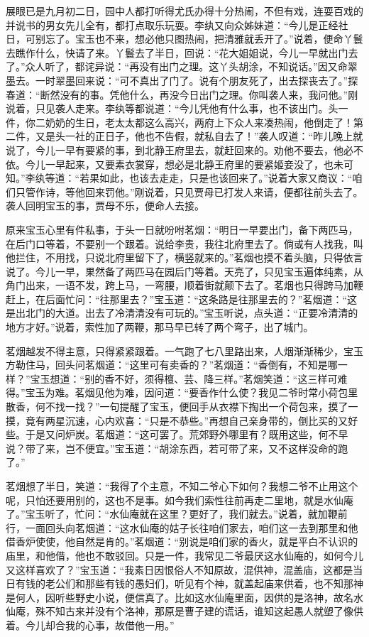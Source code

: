 \documentclass[12pt,oneside]{book}
\begin{document}
展眼已是九月初二日，园中人都打听得尤氏办得十分热闹，不但有戏，连耍百戏的并说书的男女先儿全有，都打点取乐玩耍。李纨又向众姊妹道：“今儿是正经社日，可别忘了。宝玉也不来，想必他只图热闹，把清雅就丢开了。”说着，便命丫鬟去瞧作什么，快请了来。丫鬟去了半日，回说：“花大姐姐说，今儿一早就出门去了。”众人听了，都诧异说：“再没有出门之理。这丫头胡涂，不知说话。”因又命翠墨去。一时翠墨回来说：“可不真出了门了。说有个朋友死了，出去探丧去了。”探春道：“断然没有的事。凭他什么，再没今日出门之理。你叫袭人来，我问他。”刚说着，只见袭人走来。李纨等都说道：“今儿凭他有什么事，也不该出门。头一件，你二奶奶的生日，老太太都这么高兴，两府上下众人来凑热闹，他倒走了！第二件，又是头一社的正日子，他也不告假，就私自去了！”袭人叹道：“昨儿晚上就说了，今儿一早有要紧的事，到北静王府里去，就赶回来的。劝他不要去，他必不依。今儿一早起来，又要素衣裳穿，想必是北静王府里的要紧姬妾没了，也未可知。”李纨等道：“若果如此，也该去走走，只是也该回来了。”说着大家又商议：“咱们只管作诗，等他回来罚他。”刚说着，只见贾母已打发人来请，便都往前头去了。袭人回明宝玉的事，贾母不乐，便命人去接。

原来宝玉心里有件私事，于头一日就吩咐茗烟：“明日一早要出门，备下两匹马，在后门口等着，不要别一个跟着。说给李贵，我往北府里去了。倘或有人找我，叫他拦住，不用找，只说北府里留下了，横竖就来的。”茗烟也摸不着头脑，只得依言说了。今儿一早，果然备了两匹马在园后门等着。天亮了，只见宝玉遍体纯素，从角门出来，一语不发，跨上马，一弯腰，顺着街就颠下去了。茗烟也只得跨马加鞭赶上，在后面忙问：“往那里去？”宝玉道：“这条路是往那里去的？”茗烟道：“这是出北门的大道。出去了冷清清没有可玩的。”宝玉听说，点头道：“正要冷清清的地方才好。”说着，索性加了两鞭，那马早已转了两个弯子，出了城门。

茗烟越发不得主意，只得紧紧跟着。一气跑了七八里路出来，人烟渐渐稀少，宝玉方勒住马，回头问茗烟道：“这里可有卖香的？”茗烟道：“香倒有，不知是哪一样？”宝玉想道：“别的香不好，须得檀、芸、降三样。”茗烟笑道：“这三样可难得。”宝玉为难。茗烟见他为难，因问道：“要香作什么使？我见二爷时常小荷包里散香，何不找一找？”一句提醒了宝玉，便回手从衣襟下掏出一个荷包来，摸了一摸，竟有两星沉速，心内欢喜：“只是不恭些。”再想自己亲身带的，倒比买的又好些。于是又问炉炭。茗烟道：“这可罢了。荒郊野外哪里有？既用这些，何不早说？带了来，岂不便宜。”宝玉道：“胡涂东西，若可带了来，又不这样没命的跑了。”

茗烟想了半日，笑道：“我得了个主意，不知二爷心下如何？我想二爷不止用这个呢，只怕还要用别的，这也不是事。如今我们索性往前再走二里地，就是水仙庵了。”宝玉听了，忙问：“水仙庵就在这里？更好了，我们就去。”说着，就加鞭前行，一面回头向茗烟道：“这水仙庵的姑子长往咱们家去，咱们这一去到那里和他借香炉使使，他自然是肯的。”茗烟道：“别说是咱们家的香火，就是平白不认识的庙里，和他借，他也不敢驳回。只是一件，我常见二爷最厌这水仙庵的，如何今儿又这样喜欢了？”宝玉道：“我素日因恨俗人不知原故，混供神，混盖庙，这都是当日有钱的老公们和那些有钱的愚妇们，听见有个神，就盖起庙来供着，也不知那神是何人，因听些野史小说，便信真了。比如这水仙庵里面，因供的是洛神，故名水仙庵，殊不知古来并没有个洛神，那原是曹子建的谎话，谁知这起愚人就塑了像供着。今儿却合我的心事，故借他一用。”
\end{document}
